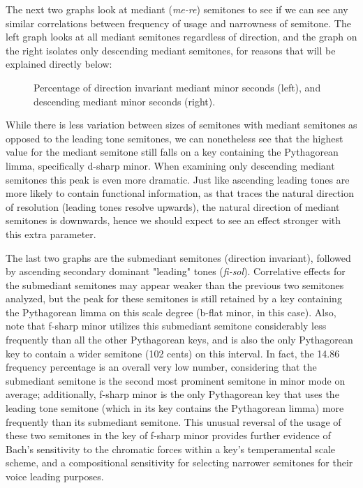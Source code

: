     The next two graphs look at mediant (\emph{me-re}) semitones to see if
we can see any similar correlations between frequency of usage and
narrowness of semitone. The left graph looks at all mediant semitones
regardless of direction, and the graph on the right isolates only
descending mediant semitones, for reasons that will be explained
directly below:



\begin{figure}[H]
    \begin{center}
    \caption[Percentage of direction invariant mediant minor seconds, and descending mediant minor seconds. ]{Percentage of direction invariant mediant minor seconds (left), and descending mediant minor seconds (right).}
    \end{center}
\end{figure}
    
    While there is less variation between sizes of semitones with mediant
semitones as opposed to the leading tone semitones, we can nonetheless
see that the highest value for the mediant semitone still falls on a key
containing the Pythagorean limma, specifically d-sharp minor. When
examining only descending mediant semitones this peak is even more
dramatic. Just like ascending leading tones are more likely to contain
functional information, as that traces the natural direction of
resolution (leading tones resolve upwards), the natural direction of
mediant semitones is downwards, hence we should expect to see an effect
stronger with this extra parameter.

The last two graphs are the submediant semitones (direction invariant),
followed by ascending secondary dominant "leading" tones
(\emph{fi-sol}). Correlative effects for the submediant semitones may
appear weaker than the previous two semitones analyzed, but the peak for
these semitones is still retained by a key containing the Pythagorean
limma on this scale degree (b-flat minor, in this case). Also, note that
f-sharp minor utilizes this submediant semitone considerably less
frequently than all the other Pythagorean keys, and is also the only
Pythagorean key to contain a wider semitone (102 cents) on this
interval. In fact, the 14.86 frequency percentage is an overall very low
number, considering that the submediant semitone is the second most
prominent semitone in minor mode on average; additionally, f-sharp minor
is the only Pythagorean key that uses the leading tone semitone (which
in its key contains the Pythagorean limma) more frequently than its
submediant semitone. This unusual reversal of the usage of these two
semitones in the key of f-sharp minor provides further evidence of
Bach's sensitivity to the chromatic forces within a key's temperamental
scale scheme, and a compositional sensitivity for selecting narrower
semitones for their voice leading purposes.

